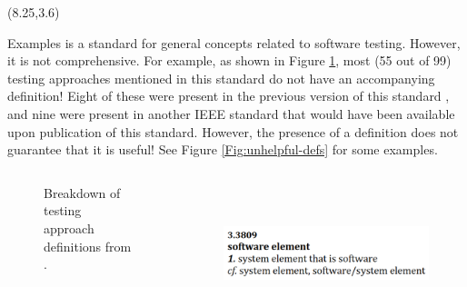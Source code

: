 \documentclass[22pt]{beamer}
\begin{document}
\begin{frame}[fragile]
    \begin{textblock}{7.25}(8.25,3.6)
        \begin{block}{\fontsize{37}{20}\selectfont Examples}
            \citep{IEEE2022} is a standard for general concepts related to
            software testing. However, it is not comprehensive. For example, as
            shown in Figure \ref{Fig:IEEEdefs}, most (55 out of 99) testing
            approaches mentioned in this standard do not have an accompanying
            definition! Eight of these were present in the previous version of
            this standard \citeyearpar{IEEE2013}, and nine were present in another
            IEEE standard \citeyearpar{IEEE2017} that would have been available
            upon publication of this standard. However, the presence of a
            definition does not guarantee that it is useful! See Figure
            \ref{Fig:unhelpful-defs} for some examples.

            \begin{columns}
                \begin{column}{0.4\textwidth}
                    \begin{center}
                        \begin{figure}
                            \label{Fig:IEEEdefs}
                            \caption{Breakdown of testing approach definitions from \cite{IEEE2022}.}
                        \end{figure}
                    \end{center}
                \end{column}
                \begin{column}{0.4\textwidth}
                    \begin{center}
                        \begin{figure}
                            \includegraphics[height=4cm]{software element.png}


\end{figure}
\end{center}
\end{column}
\end{columns}
\end{block}
\end{textblock}
\end{frame}
\end{document}
